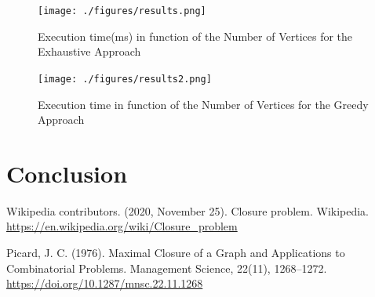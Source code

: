 \documentclass[...]{revdetua}
\begin{document}
\begin{figure}[!htb]
\flushleft
    \texttt{[image: ./figures/results.png]}
    \caption{Execution time(ms) in function of the Number of Vertices for the Exhaustive Approach}
    \label{fig: Example Solution}
\end{figure}


\begin{table}[!htb]
\caption{\label{tab:table-name}Obtained results for the Greedy Approach}
\end{table}
 


\begin{figure}[!htb]
    \centering
    \texttt{[image: ./figures/results2.png]}
    \caption{Execution time in function of the Number of Vertices for the Greedy Approach}
    \label{fig: Example Solution}
\end{figure}


\section{Conclusion}


\begin{thebibliography}{9}

Wikipedia contributors. (2020, November 25). Closure problem. Wikipedia. \url{https://en.wikipedia.org/wiki/Closure_problem}

Picard, J. C. (1976). Maximal Closure of a Graph and Applications to Combinatorial Problems. Management Science, 22(11), 1268–1272. 
\url{https://doi.org/10.1287/mnsc.22.11.1268}
\end{thebibliography}




\end{document}
